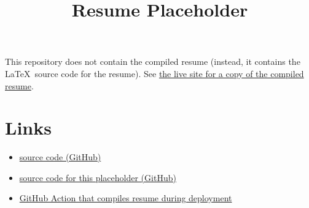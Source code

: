\documentclass{article}
\title{\vspace{-7ex}Resume Placeholder}
\author{\vspace{-9ex}}
\date{\vspace{-9ex}}
\begin{document}
\maketitle
\thispagestyle{plain}

\noindent
This repository does not contain the compiled resume (instead, it contains the \LaTeX\ source code for the resume).
See \href{https://jazevedo.me/resume}{the live site for a copy of the compiled resume}.

\section{Links}
\begin{itemize}
    \item \href{https://github.com/jazeved0/jazevedo.me/tree/main/src/resume/main.tex}{source code (GitHub)}
    \item \href{https://github.com/jazeved0/jazevedo.me/tree/main/src/resume/placeholder.tex}{source code for this placeholder (GitHub)}
    \item \href{https://github.com/jazeved0/jazevedo.me/tree/main/.github/workflows/deploy.yaml}{GitHub Action that compiles resume during deployment}
\end{itemize}
\end{document}
